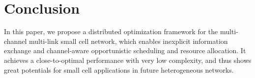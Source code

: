\documentclass[conference]{IEEEtran}
\begin{document}
\section{Conclusion}
\label{sec:conclusion}


In this paper, we propose a distributed optimization framework for the
multi-channel multi-link small cell network, which enables inexplicit information exchange and channel-aware opportunistic scheduling and resource allocation. It achieves a close-to-optimal performance with very low complexity, and thus shows great potentials for small cell applications in future heterogeneous networks.











\end{document}
